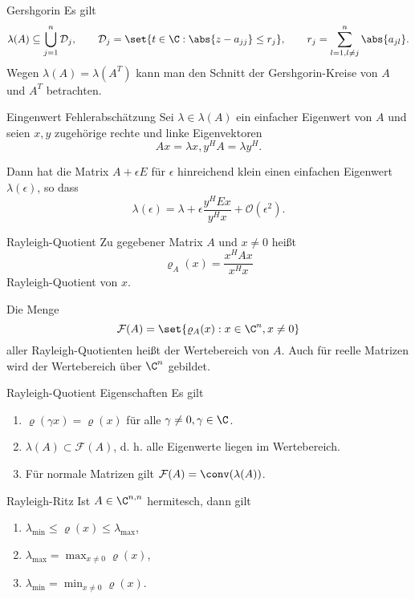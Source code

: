 \begin{karte}{Gershgorin}
    Es gilt 
    \[ \lambda(A) \subseteq \bigcup_{j=1}^n \mathcal{D}_j, 
    \qquad \mathcal{D}_j = \set{t\in \C: \abs{z - a_{jj}}\leq r_j}, 
    \qquad r_j = \sum_{l=1, l\neq j}^n \abs{a_{jl}}. \]
    Wegen \(\lambda(A) = \lambda(A^T)\) kann man den Schnitt der 
    Gershgorin-Kreise von \(A\) und \(A^T\) betrachten.
\end{karte}

\begin{karte}{Eingenwert Fehlerabschätzung}
    Sei \(\lambda \in \lambda(A)\) ein einfacher Eigenwert von \(A\) 
    und seien \(x, y\) zugehörige rechte und linke Eigenvektoren 
    \[ Ax = \lambda x, y^H A = \lambda y^H. \]

    Dann hat die Matrix \( A + \epsilon E \) für \(\epsilon\) hinreichend 
    klein einen einfachen Eigenwert \( \lambda(\epsilon) \), so dass 
    \[ \lambda(\epsilon) = \lambda + \epsilon \frac{y^H E x}{y^H x} + \mathcal{O}(\epsilon^2). \]
\end{karte}

\begin{karte}{Rayleigh-Quotient}
    Zu gegebener Matrix \(A\) und \(x \neq 0\) heißt 
    \[ \varrho_A(x) = \frac{x^H A x}{x^H x} \]
    Rayleigh-Quotient von \(x\).

    Die Menge 
    \[ \mathcal{F}(A) = \set{\varrho_A(x) : x\in \C^n, x\neq 0} \]
    aller Rayleigh-Quotienten heißt der Wertebereich von \(A\).
    Auch für reelle Matrizen wird der Wertebereich über \(\C^n\) gebildet.
\end{karte}

\begin{karte}{Rayleigh-Quotient Eigenschaften}
    Es gilt 
    \begin{enumerate}
        \item \( \varrho(\gamma x) = \varrho(x) \) für alle \(\gamma \neq 0, \gamma \in \C\).
        \item \( \lambda(A) \subset \mathcal{F}(A) \), d. h. alle Eigenwerte liegen im Wertebereich.
        \item Für normale Matrizen gilt \( \mathcal{F}(A) = \conv(\lambda(A)) \).
    \end{enumerate}
\end{karte}

\begin{karte}{Rayleigh-Ritz}
    Ist \( A\in \C^{n,n} \) hermitesch, dann gilt 
    \begin{enumerate}
        \item \( \lambda_{\min} \leq \varrho(x) \leq \lambda_{\max} \),
        \item \(\lambda_{\max} = \max_{x\neq 0} \varrho(x) \), 
        \item \( \lambda_{\min} = \min_{x\neq 0} \varrho(x) \).
    \end{enumerate}
\end{karte}

